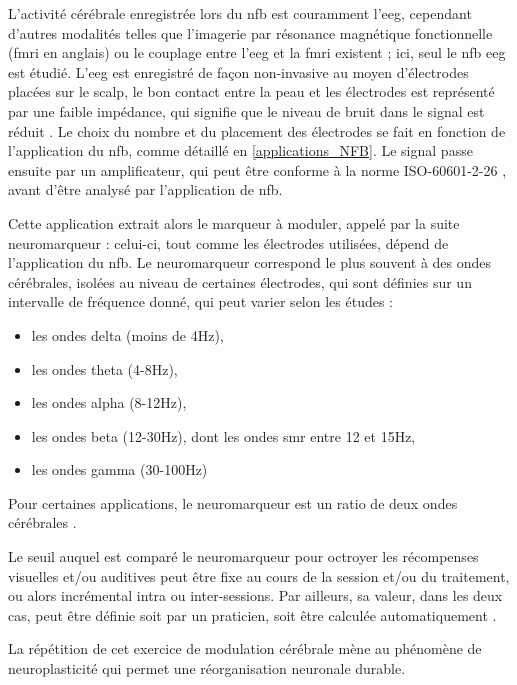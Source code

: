 L'activité cérébrale enregistrée lors du \gls{nfb} est couramment l'\gls{eeg}, cependant d'autres modalités telles que l'imagerie par résonance 
magnétique fonctionnelle (\gls{fmri} en anglais) \citep{Sulzer2013} ou le couplage entre l'\gls{eeg} et la \gls{fmri} \citep{Perronnet2017} existent ; ici,
seul le \gls{nfb} \gls{eeg} est étudié. L'\gls{eeg} est enregistré de façon non-invasive au moyen d'électrodes placées sur le scalp, 
le bon contact entre la peau et les électrodes est représenté par une faible impédance, qui signifie que le niveau de bruit dans le 
signal est réduit \citep{Kappenman2010}. Le choix du nombre et du placement des électrodes se fait en fonction de l'application du \gls{nfb}, comme détaillé en 
\ref{applications_NFB}. Le signal passe ensuite par un amplificateur, qui peut être conforme à la norme ISO-60601-2-26 \citep{ISO}, avant d'être analysé 
par l'application de \gls{nfb}. 

Cette application extrait alors le marqueur à moduler, appelé par la suite neuromarqueur : celui-ci, tout comme les électrodes utilisées, 
dépend de l'application du \gls{nfb}. Le neuromarqueur correspond le plus souvent à des ondes cérébrales, isolées au niveau de certaines électrodes,
qui sont définies sur un intervalle de fréquence donné, qui peut varier selon les études \citep{Marzbani2016} :
\renewcommand{\labelitemi}{$\bullet$}
\renewcommand{\labelitemii}{$\cdot$}
\begin{itemize}
\item les ondes delta (moins de 4Hz),
\item les ondes theta (4-8Hz),
\item les ondes alpha (8-12Hz),
\item les ondes beta (12-30Hz), dont les ondes \gls{smr} entre 12 et 15Hz,
\item les ondes gamma (30-100Hz)
\end{itemize}
Pour certaines applications, le neuromarqueur est un ratio de deux ondes cérébrales \citep{Gevensleben2009}.

Le seuil auquel est comparé le neuromarqueur pour octroyer les récompenses visuelles et/ou auditives peut être fixe 
au cours de la session et/ou du traitement, ou alors incrémental intra ou inter-sessions. Par ailleurs, sa valeur, dans 
les deux cas, peut être définie soit par un praticien, soit être calculée automatiquement \citep{Arns2014}. 

La répétition de cet exercice de modulation cérébrale mène au phénomène de 
neuroplasticité \citep{VanDoren2017, Ros2010} qui permet une réorganisation neuronale durable.

